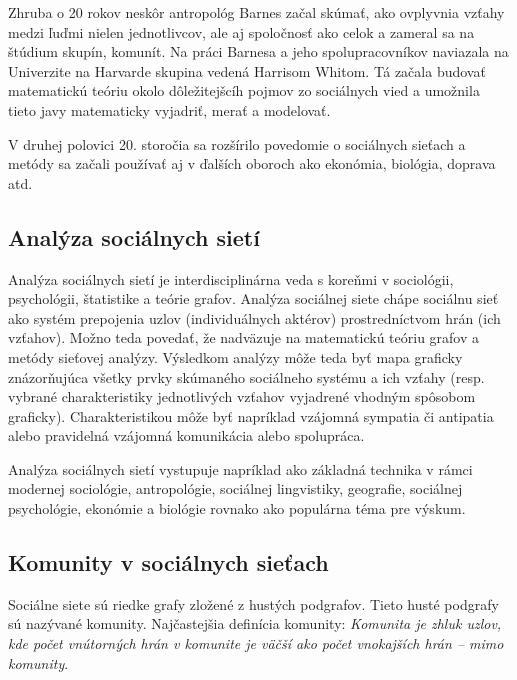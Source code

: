 \documentclass[slovak,master,public,dept460,male,cpdeclaration,oneside]{diploma}
\begin{document}
Zhruba o 20 rokov neskôr antropológ Barnes začal skúmať, ako ovplyvnia vzťahy medzi ľuďmi nielen jednotlivcov, ale aj spoločnosť ako celok a zameral sa na štúdium skupín, komunít. Na práci Barnesa a jeho spolupracovníkov naviazala na Univerzite na Harvarde skupina vedená Harrisom Whitom. Tá začala budovať matematickú teóriu okolo dôležitejšcíh pojmov zo sociálnych vied a umožnila tieto javy matematicky vyjadriť, merať a modelovať.

V druhej polovici 20. storočia sa rozšírilo povedomie o sociálnych sieťach a metódy sa začali používať aj v ďalších oboroch ako ekonómia, biológia, doprava atd.

\subsection{Analýza sociálnych sietí}

Analýza sociálnych sietí je interdisciplinárna veda s koreňmi v sociológii, psychológii,
štatistike a teórie grafov. Analýza sociálnej siete chápe sociálnu sieť ako systém prepojenia uzlov (individuálnych aktérov) prostredníctvom hrán (ich vzťahov). Možno teda povedať, že nadväzuje na matematickú teóriu grafov a metódy sieťovej analýzy. Výsledkom analýzy môže teda byť mapa graficky znázorňujúca všetky prvky skúmaného sociálneho systému a ich vzťahy (resp. vybrané charakteristiky jednotlivých vzťahov vyjadrené vhodným spôsobom graficky). Charakteristikou môže byť napríklad vzájomná sympatia či antipatia alebo pravidelná vzájomná komunikácia alebo spolupráca.


Analýza sociálnych sietí vystupuje napríklad ako základná technika v rámci modernej sociológie,
antropológie, sociálnej lingvistiky, geografie, sociálnej psychológie, ekonómie a biológie
rovnako ako populárna téma pre výskum. 

\subsection{Komunity v sociálnych sieťach}

Sociálne siete sú riedke grafy zložené z hustých podgrafov. Tieto husté podgrafy sú nazývané
komunity. Najčastejšia definícia komunity: \textit{Komunita je zhluk uzlov, kde počet vnútorných hrán v komunite je väčší ako počet vnokajších hrán – mimo komunity}. \cite{8}
\end{document}
